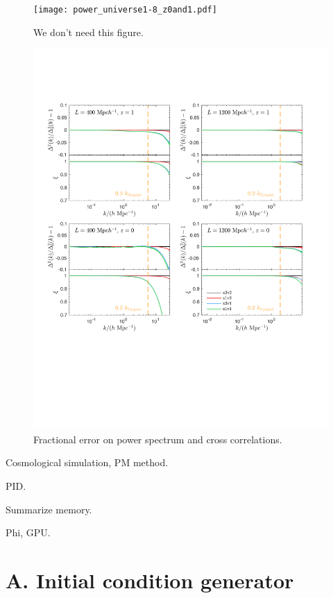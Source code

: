 \documentclass[10pt,twocolumn,preprint]{emulateapj}
\begin{document}
\begin{figure}
\centering
  \texttt{[image: power\_universe1-8\_z0and1.pdf]}
 \caption{We don't need this figure.}
\label{fig.power}
\end{figure}


\begin{figure}
\centering
  \includegraphics[width=1.1\linewidth]{diff_power.pdf}
 \caption{Fractional error on power spectrum and cross correlations.}
\label{fig.ccc}
\end{figure}

 Cosmological simulation, PM method.

PID.

Summarize memory.

Phi, GPU.


\clearpage

\appendix

\section{A. Initial condition generator}


\acknowledgements



\end{document}
